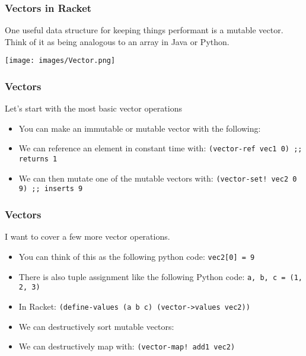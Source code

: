 \documentclass{beamer}
\begin{document}
\begin{frame}
  \frametitle{Vectors in Racket}
  One useful data structure for keeping things performant is a mutable vector.
  Think of it as being analogous to an array in Java or Python.
  \pause
  \begin{center}
    \texttt{[image: images/Vector.png]}
  \end{center}  
\end{frame}


\begin{frame}
  \frametitle{Vectors}
  Let's start with the most basic vector operations
  \begin{itemize}
  \item<2-> You can make an immutable or mutable vector with the following:
  \item<3-> We can reference an element in constant time with:
    \texttt{(vector-ref vec1 0) ;; returns 1}
  \item<4-> We can then mutate one of the mutable vectors with:
    \texttt{(vector-set! vec2 0 9) ;; inserts 9}
  \end{itemize}
\end{frame}

\begin{frame}
  \frametitle{Vectors}
  I want to cover a few more vector operations.
  \begin{itemize}
  \item<2-> You can think of this as the following python code:
    \texttt{vec2[0] = 9}
  \item<3-> There is also tuple assignment like the following Python code:
    \texttt{a, b, c = (1, 2, 3)}
  \item<4-> In Racket:
    \texttt{(define-values (a b c) (vector->values vec2))}
  \item<5-> We can destructively sort mutable vectors:
    \vecSort
  \item<6-> We can destructively map with:
    \texttt{(vector-map! add1 vec2)}
  \end{itemize}    
\end{frame}

\end{document}
